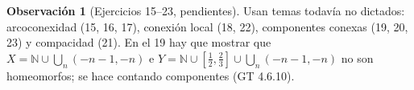 \documentclass[11pt,a4paper]{article}
\theoremstyle{definition}
\newtheorem{observacion}[definicion]{Observación}
\theoremstyle{plain}
\newcommand{\N}{\mathbb{N}}
\begin{document}
\begin{observacion}[Ejercicios 15--23, pendientes]
Usan temas todavía no dictados: arcoconexidad (15, 16, 17), conexión local (18, 22), componentes conexas (19, 20, 23) y compacidad (21). En el 19 hay que mostrar que $X=\N\cup\bigcup_n(-n-1,-n)$ e $Y=\N\cup[\tfrac12,\tfrac23]\cup\bigcup_n(-n-1,-n)$ no son homeomorfos; se hace contando componentes (GT 4.6.10).
\end{observacion}
\end{document}
